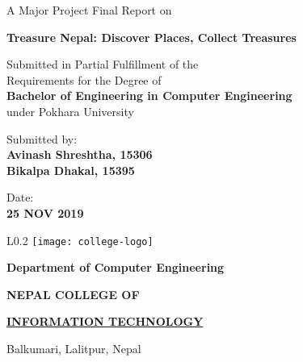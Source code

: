 \documentclass[12pt, a4paper]{report}
\begin{document}
\begin{titlepage}
	\begin{center}
	
	\large%
	A Major Project Final Report on
	
	\huge %
	\textbf{Treasure Nepal: Discover Places, Collect Treasures}

	\vfill
	
	\large %
	Submitted in Partial Fulfillment of the \\ 
	Requirements for the Degree of \\ 
	\textbf {Bachelor of Engineering in Computer Engineering} \\
	under Pokhara University
	
	\vfill
	
	Submitted by: \\ 
	\textbf {Avinash Shreshtha, 15306} \\
	\textbf {Bikalpa Dhakal, 15395} \\
	
	\vfill
	
	
	
	Date: \\
	\textbf {25 NOV 2019}
	
	\vfill
	
	\end{center}
	
	\begin{wrapfigure}{L}{0.2\textwidth}
	\centering
	\texttt{[image: college-logo]}
	\end{wrapfigure}
	
	\selectfont
	
	\textbf {Department of Computer Engineering}  
	
	\Large %
	\textbf {NEPAL COLLEGE OF} 
	
	\LARGE %
	\textbf {\underline {INFORMATION TECHNOLOGY} }
	
	\small %
	Balkumari, Lalitpur, Nepal
	
	
\end{titlepage}
\end{document}
